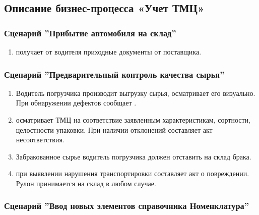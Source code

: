 \newpage
\subsection{Описание бизнес-процесса «Учет ТМЦ»}
\label{bp:storage}

\subsubsection{Сценарий ''Прибытие автомобиля на склад''}
\label{bp:storage_1}


\begin{enumerate}

\item	\kladovshik получает от водителя приходные документы от поставщика.

\end{enumerate}




\subsubsection{Сценарий ''Предварительный контроль качества сырья''}
\label{bp:storage_2}


\begin{enumerate}

\item  Водитель погрузчика производит выгрузку сырья, \kladovshik осматривает его визуально. При обнаружении дефектов сообщает \laborant.

\item	\kladovshik 
осматривает ТМЦ на соответствие заявленным характеристикам, сортности, целостности упаковки. При наличии отклонений составляет акт несоответствия.

\item Забракованное сырье водитель погрузчика должен отставить на склад брака.

\item \kladovshik при выявлении нарушения транспортировки составляет акт о повреждении.  Рулон принимается на склад в любом случае.
\end{enumerate}


\subsubsection{Сценарий ''Ввод новых элементов справочника Номенклатура''}
\label{bp:storage_4}



